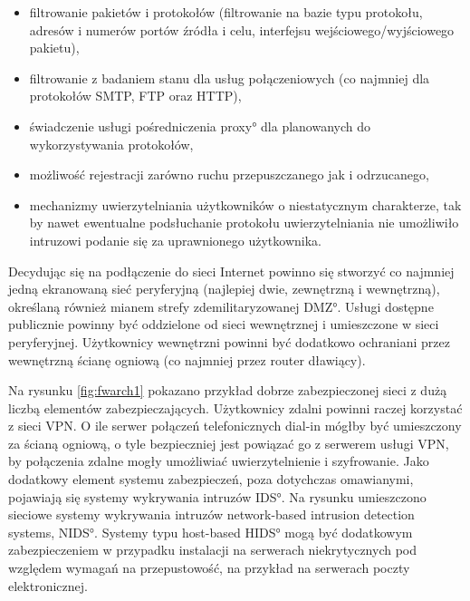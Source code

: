 \begin{itemize}

\item filtrowanie pakietów i protokołów (filtrowanie na bazie typu
protokołu, adresów i numerów portów źródła i celu, interfejsu
wejściowego/wyjściowego pakietu),

\item filtrowanie z badaniem stanu dla usług połączeniowych (co najmniej dla
protokołów SMTP, FTP oraz HTTP),

\item świadczenie usługi pośredniczenia \ang{proxy} dla planowanych do
wykorzystywania protokołów,

\item możliwość rejestracji zarówno ruchu przepuszczanego jak i
odrzucanego,

\item mechanizmy uwierzytelniania użytkowników o niestatycznym charakterze,
tak by nawet ewentualne podsłuchanie protokołu uwierzytelniania nie
umożliwiło intruzowi podanie się za uprawnionego użytkownika.

\end{itemize}

Decydując się na podłączenie do sieci Internet powinno się stworzyć co
najmniej jedną ekranowaną sieć peryferyjną (najlepiej dwie, zewnętrzną i
wewnętrzną), określaną również mianem strefy zdemilitaryzowanej \ang{DMZ}.
Usługi dostępne publicznie powinny być oddzielone od sieci wewnętrznej i
umieszczone w sieci peryferyjnej. Użytkownicy wewnętrzni powinni być
dodatkowo ochraniani przez wewnętrzną ścianę ogniową (co najmniej przez
router dławiący).

\begin{figure*}
\begin{center}

\end{center}
\caption[Rozbudowana architektura ściany ogniowej]
{\label{fig:fwarch1} Rozbudowana architektura ściany ogniowej.}
\end{figure*}

Na rysunku \ref{fig:fwarch1} pokazano przykład dobrze zabezpieczonej sieci z
dużą liczbą elementów zabezpieczających. Użytkownicy zdalni powinni raczej
korzystać z sieci VPN. O ile serwer połączeń telefonicznych dial-in mógłby
być umieszczony za ścianą ogniową, o tyle bezpieczniej jest powiązać go z
serwerem usługi VPN, by połączenia zdalne mogły umożliwiać uwierzytelnienie
i szyfrowanie. Jako dodatkowy element systemu zabezpieczeń, poza dotychczas
omawianymi, pojawiają się systemy wykrywania intruzów \ang{IDS}. Na rysunku
umieszczono sieciowe systemy wykrywania intruzów \ang{network-based
intrusion detection systems, NIDS}. Systemy typu host-based \ang{HIDS} mogą
być dodatkowym zabezpieczeniem w przypadku instalacji na serwerach
niekrytycznych pod względem wymagań na przepustowość, na przykład na
serwerach poczty elektronicznej.

